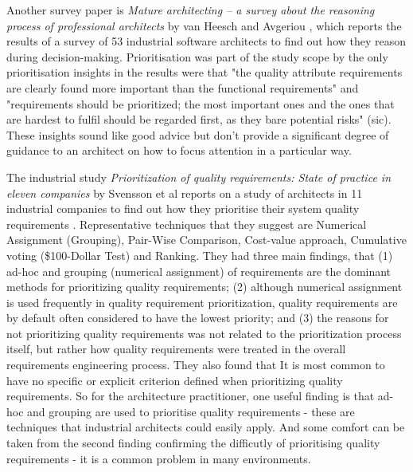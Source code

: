 Another survey paper is \emph{Mature architecting -- a survey about the reasoning process of professional architects} by van Heesch and Avgeriou \cite{vanheesch2011-maturearch}, which reports the results of a survey of 53 industrial software architects to find out how they reason during decision-making.  Prioritisation was part of the study scope by the only prioritisation insights in the results were   
that "the quality attribute requirements are clearly found more important than the functional requirements" and "requirements should be prioritized; the most important ones and the ones that are hardest to fulfil should be regarded first, as they bare potential risks" (sic).  These insights sound like good advice but don't provide a significant degree of guidance to an architect on how to focus attention in a particular way.

The industrial study \emph{Prioritization of quality requirements: State of practice in eleven companies} by Svensson et al reports on a study of architects in 11 industrial companies to find out how they prioritise their system quality requirements \cite{svensson2011-qrprioritisation} .  Representative techniques that they suggest are Numerical Assignment (Grouping), Pair-Wise Comparison, Cost-value approach, Cumulative voting (\$100-Dollar Test) and Ranking.  They had three main findings, that (1) ad-hoc and grouping (numerical assignment) of requirements are the dominant methods for prioritizing quality requirements; (2) although numerical assignment is used frequently in quality requirement prioritization, quality requirements are by default often considered to have the lowest priority; and (3) the reasons for not prioritizing quality requirements was not related to the prioritization process itself, but rather how quality requirements were treated in the overall requirements engineering process.  They also found that It is most common to have no specific or explicit criterion defined when prioritizing quality requirements.  So for the architecture practitioner, one useful finding is that ad-hoc and grouping are used to prioritise quality requirements - these are techniques that industrial architects could easily apply.  And some comfort can be taken from the second finding confirming the difficutly of prioritising quality requirements - it is a common problem in many environments.

